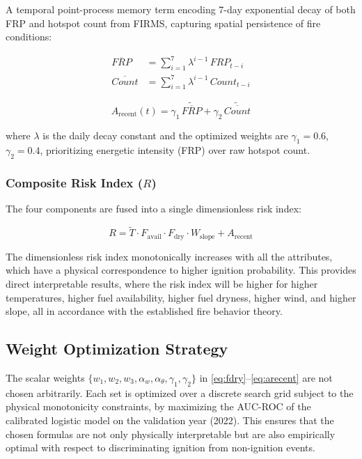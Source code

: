 \documentclass[conference]{IEEEtran}
\begin{document}
A temporal point-process memory term encoding 7-day exponential decay of both FRP
and hotspot count from FIRMS, capturing spatial persistence of fire conditions:

\begin{align}
\overline{\mathit{FRP}} &= \sum_{i=1}^{7} \lambda^{i-1}\,\mathit{FRP}_{t-i} \label{eq:frphist}\\
\overline{\mathit{Count}} &= \sum_{i=1}^{7} \lambda^{i-1}\,\mathit{Count}_{t-i} \label{eq:cnthist}
\end{align}

\begin{equation}
A_{\mathrm{recent}}(t) = \gamma_1\,\widetilde{\overline{\mathit{FRP}}}
+ \gamma_2\,\widetilde{\overline{\mathit{Count}}}
\label{eq:arecent}
\end{equation}

where $\lambda$ is the daily decay constant and the optimized weights are
$\gamma_1 = 0.6$, $\gamma_2 = 0.4$, prioritizing energetic intensity (FRP) over
raw hotspot count.

\subsubsection{Composite Risk Index ($R$)}

The four components are fused into a single dimensionless risk index:

\begin{equation}
R = \tilde{T} \cdot F_{\mathrm{avail}} \cdot F_{\mathrm{dry}} \cdot W_{\mathrm{slope}}
+ A_{\mathrm{recent}}
\label{eq:rphys}
\end{equation}

The dimensionless risk index monotonically increases with all the attributes, which have a physical correspondence to higher ignition probability. This provides direct interpretable results, where the risk index will be higher for higher temperatures, higher fuel availability, higher fuel dryness, higher wind, and higher slope, all in accordance with the established fire behavior theory.

\subsection{Weight Optimization Strategy}

The scalar weights $\{w_1, w_2, w_3, \alpha_w, \alpha_\theta, \gamma_1, \gamma_2\}$
in \eqref{eq:fdry}--\eqref{eq:arecent} are not chosen arbitrarily. Each set is
optimized over a discrete search grid subject to the physical monotonicity
constraints, by maximizing the AUC-ROC of the calibrated logistic model on the
validation year (2022). This ensures that the chosen formulas are not only
physically interpretable but are also empirically optimal with respect to
discriminating ignition from non-ignition events.
\end{document}
